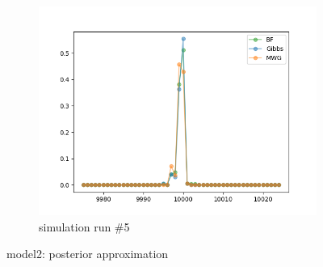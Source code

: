 \begin{figure}[H]
\begin{subfigure}{.3\textwidth}
    	\includegraphics[width=\linewidth]{../../plots/Posterior_post_burnin_M2_N20000_NMCMC3_seed4_diffind2.png}
    	\caption{simulation run \#5}
	\end{subfigure}
	\caption{model2: posterior approximation}
\end{figure}

